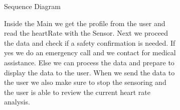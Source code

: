 \documentclass{article}
\begin{document}
\begin{figure}[htbp]
	\centering
	\begin{subfigure}{\textwidth}
		\resizebox{\textwidth}{!}{}
		\caption{Sequence Diagram}
	\end{subfigure}
	\begin{subfigure}{\textwidth}
		Inside the Main we get the profile from the user and read the heartRate with the Sensor. Next we proceed the data and check 
		if a safety confirmation is needed. If yes we do an emergency call and we contact for medical assistance. Else we can process 
		the data and prepare to display the data to the user. When we send the data to the user we also make sure to stop the sensoring and 
		the user is able to review the current heart rate analysis. 
	\end{subfigure}
\end{figure}
\newpage
\end{document}
